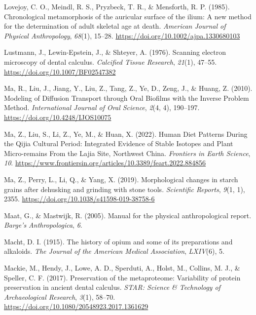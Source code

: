 \documentclass[
  letterpaper,
]{book}
\newlength{\cslhangindent}
\newlength{\cslentryspacingunit} %
\newenvironment{CSLReferences}[2] %
 {%
  \setlength{\parindent}{0pt}
  \ifodd #1
  \let\oldpar\par
  \def\par{\hangindent=\cslhangindent\oldpar}
  \fi
  \setlength{\parskip}{#2\cslentryspacingunit}
 }%
 {}
\begin{document}
\begin{CSLReferences}{1}{0}
\leavevmode{}%
Lovejoy, C. O., Meindl, R. S., Pryzbeck, T. R., \& Mensforth, R. P.
(1985). Chronological metamorphosis of the auricular surface of the
ilium: {A} new method for the determination of adult skeletal age at
death. \emph{American Journal of Physical Anthropology}, \emph{68}(1),
15--28. \url{https://doi.org/10.1002/ajpa.1330680103}

\leavevmode{}%
Lustmann, J., Lewin-Epstein, J., \& Shteyer, A. (1976). Scanning
electron microscopy of dental calculus. \emph{Calcified Tissue
Research}, \emph{21}(1), 47--55.
\url{https://doi.org/10.1007/BF02547382}

\leavevmode{}%
Ma, R., Liu, J., Jiang, Y., Liu, Z., Tang, Z., Ye, D., Zeng, J., \&
Huang, Z. (2010). Modeling of {Diffusion Transport} through {Oral
Biofilms} with the {Inverse Problem Method}. \emph{International Journal
of Oral Science}, \emph{2}(4, 4), 190--197.
\url{https://doi.org/10.4248/IJOS10075}

\leavevmode{}%
Ma, Z., Liu, S., Li, Z., Ye, M., \& Huan, X. (2022). Human {Diet
Patterns During} the {Qijia Cultural Period}: {Integrated Evidence} of
{Stable Isotopes} and {Plant Micro-remains From} the {Lajia Site},
{Northwest China}. \emph{Frontiers in Earth Science}, \emph{10}.
\url{https://www.frontiersin.org/articles/10.3389/feart.2022.884856}

\leavevmode{}%
Ma, Z., Perry, L., Li, Q., \& Yang, X. (2019). Morphological changes in
starch grains after dehusking and grinding with stone tools.
\emph{Scientific Reports}, \emph{9}(1, 1), 2355.
\url{https://doi.org/10.1038/s41598-019-38758-6}

\leavevmode{}%
Maat, G., \& Mastwijk, R. (2005). Manual for the physical
anthropological report. \emph{Barge's Anthropologica}, \emph{6}.

\leavevmode{}%
Macht, D. I. (1915). The history of opium and some of its preparations
and alkaloids. \emph{The Journal of the American Medical Association},
\emph{LXIV}(6), 5.

\leavevmode{}%
Mackie, M., Hendy, J., Lowe, A. D., Sperduti, A., Holst, M., Collins, M.
J., \& Speller, C. F. (2017). Preservation of the metaproteome:
Variability of protein preservation in ancient dental calculus.
\emph{STAR: Science \& Technology of Archaeological Research},
\emph{3}(1), 58--70. \url{https://doi.org/10.1080/20548923.2017.1361629}


\end{CSLReferences}
\end{document}
